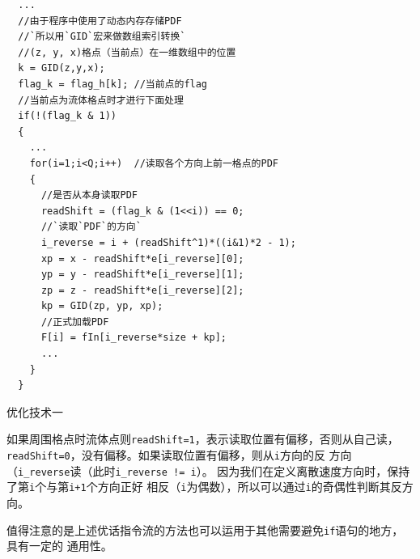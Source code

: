 \begin{Code}
\begin{lstlisting}
  ...
  //由于程序中使用了动态内存存储PDF
  //`所以用`GID`宏来做数组索引转换`
  //(z, y, x)格点（当前点）在一维数组中的位置
  k = GID(z,y,x); 
  flag_k = flag_h[k]; //当前点的flag
  //当前点为流体格点时才进行下面处理
  if(!(flag_k & 1)) 
  {
    ...
    for(i=1;i<Q;i++)  //读取各个方向上前一格点的PDF
    {
      //是否从本身读取PDF
      readShift = (flag_k & (1<<i)) == 0; 
      //`读取`PDF`的方向`
      i_reverse = i + (readShift^1)*((i&1)*2 - 1);
      xp = x - readShift*e[i_reverse][0];   
      yp = y - readShift*e[i_reverse][1];
      zp = z - readShift*e[i_reverse][2];
      kp = GID(zp, yp, xp);  
      //正式加载PDF
      F[i] = fIn[i_reverse*size + kp]; 
      ...
    }
  }
\end{lstlisting}  
\caption{优化技术一}
\label{code:opt2}
\end{Code}
如果周围格点时流体点则\texttt{readShift=1}，表示读取位置有偏移，否则从自己读，
\texttt{readShift=0}，没有偏移。如果读取位置有偏移，则从\texttt{i}方向的反
方向（\texttt{i\_reverse}读（此时\texttt{i\_reverse != i}）。
因为我们在定义离散速度方向时，保持了第\texttt{i}个与第\texttt{i+1}个方向正好
相反（\texttt{i}为偶数），所以可以通过\texttt{i}的奇偶性判断其反方向。

值得注意的是上述优话指令流的方法也可以运用于其他需要避免\texttt{if}语句的地方，具有一定的
通用性。

